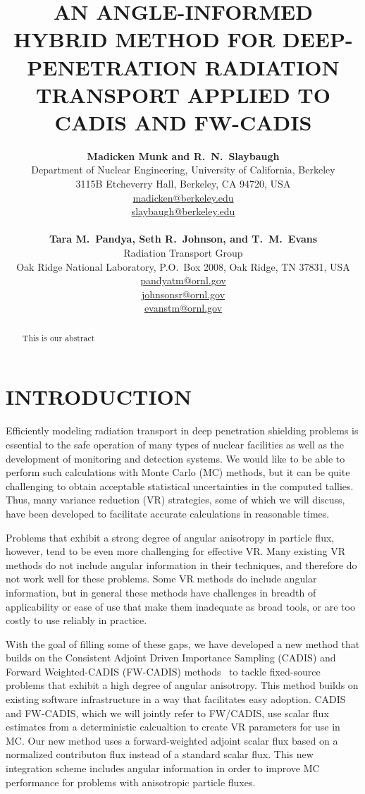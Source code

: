 \documentclass[12pt]{article}
\title{AN ANGLE-INFORMED HYBRID METHOD FOR DEEP-PENETRATION RADIATION TRANSPORT APPLIED TO CADIS AND FW-CADIS}
\author{ 
  \textbf{Madicken Munk and R.~N.~Slaybaugh} \\
  Department of Nuclear Engineering, University of California, Berkeley \\
  3115B Etcheverry Hall, Berkeley, CA 94720, USA\\
  \href{mailto:madicken@berkeley.edu}{madicken@berkeley.edu}\\
  \href{mailto:slaybaugh@berkeley.edu}{slaybaugh@berkeley.edu}\\
  \\
  \textbf{Tara M.~Pandya, Seth R.~Johnson, and T.~M.~Evans}\\
  Radiation Transport Group\\
  Oak Ridge National Laboratory, P.O.\ Box 2008, Oak Ridge, TN 37831, USA\\
  \href{mailto:pandyatm@ornl.gov}{pandyatm@ornl.gov}\\
  \href{mailto:johnsonsr@ornl.gov}{johnsonsr@ornl.gov}\\
  \href{mailto:evanstm@ornl.gov}{evanstm@ornl.gov}
  }
\begin{document}


\maketitle

\begin{abstract}
This is our abstract
\end{abstract}


%
\section{INTRODUCTION}
\label{sect::intro}

Efficiently modeling radiation transport in deep penetration shielding problems is essential to the safe operation of many types of nuclear facilities as well as the development of monitoring and detection systems. We would like to be able to perform such calculations with Monte Carlo (MC) methods, but it can be quite challenging to obtain acceptable statistical uncertainties in the computed tallies. Thus, many variance reduction (VR) strategies, some of which we will discuss, have been developed to facilitate accurate calculations in reasonable times. 

Problems that exhibit a strong degree of angular anisotropy in particle flux, however, tend to be even more challenging for effective VR.
Many existing VR methods do not include angular information in their techniques, and therefore do not work well for these problems.  
Some VR methods do include angular information, but in general these methods have challenges in breadth of applicability or ease of use that make them inadequate as broad tools, or are too costly to use reliably in practice.

With the goal of filling some of these gaps, we have developed a new method that builds on the Consistent Adjoint Driven Importance Sampling (CADIS) and Forward Weighted-CADIS (FW-CADIS) methods~\cite{wagner_forward-weighted_2007} to tackle fixed-source problems that exhibit a high degree of angular anisotropy. 
This method builds on existing software infrastructure in a way that facilitates easy adoption.
CADIS and FW-CADIS, which we will jointly refer to FW/CADIS, use scalar flux estimates from a deterministic calcualtion to create VR parameters for use in MC.
Our new method uses a forward-weighted adjoint scalar flux based on a normalized contributon flux instead of a standard scalar flux.
This new integration scheme includes angular information in order to improve MC performance for problems with anisotropic particle fluxes.
\end{document}
